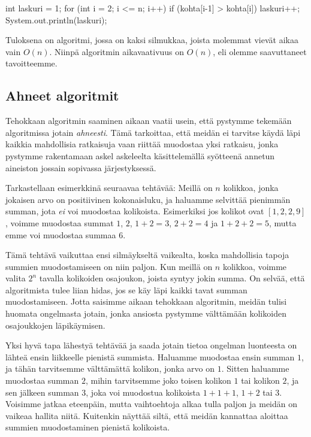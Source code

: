\begin{code}
int laskuri = 1;
for (int i = 2; i <= n; i++) {
    if (kohta[i-1] > kohta[i]) {
        laskuri++;
    }
}
System.out.println(laskuri);
\end{code}

Tuloksena on algoritmi, jossa on kaksi silmukkaa,
joista molemmat vievät aikaa vain $O(n)$.
Niinpä algoritmin aikavaativuus on $O(n)$,
eli olemme saavuttaneet tavoitteemme.

\subsection{Ahneet algoritmit}

Tehokkaan algoritmin saaminen aikaan vaatii usein,
että pystymme tekemään algoritmissa jotain \emph{ahneesti}.
Tämä tarkoittaa, että meidän ei tarvitse käydä läpi
kaikkia mahdollisia ratkaisuja vaan riittää muodostaa
yksi ratkaisu, jonka pystymme rakentamaan askel askeleelta
käsittelemällä syötteenä annetun aineiston jossain sopivassa järjestyksessä.

Tarkastellaan esimerkkinä seuraavaa tehtävää:
Meillä on $n$ kolikkoa, jonka jokaisen arvo on positiivinen kokonaisluku,
ja haluamme selvittää pienimmän summan, jota \emph{ei} voi muodostaa kolikoista.
Esimerkiksi jos kolikot ovat $[1,2,2,9]$, voimme muodostaa summat
$1$, $2$, $1+2=3$, $2+2=4$ ja $1+2+2=5$,
mutta emme voi muodostaa summaa $6$.

Tämä tehtävä vaikuttaa ensi silmäykseltä vaikealta,
koska mahdollisia tapoja summien muodostamiseen on niin paljon.
Kun meillä on $n$ kolikkoa, voimme valita $2^n$ tavalla
kolikoiden osajoukon, joista syntyy jokin summa.
On selvää, että algoritmista tulee liian hidas,
jos se käy läpi kaikki tavat summan muodostamiseen.
Jotta saisimme aikaan tehokkaan algoritmin,
meidän tulisi huomata ongelmasta jotain,
jonka ansiosta pystymme välttämään kolikoiden osajoukkojen läpikäymisen.

Yksi hyvä tapa lähestyä tehtävää ja saada jotain tietoa ongelman luonteesta
on lähteä ensin liikkeelle pienistä summista.
Haluamme muodostaa ensin summan $1$, ja tähän tarvitsemme välttämättä
kolikon, jonka arvo on $1$.
Sitten haluamme muodostaa summan $2$, mihin tarvitsemme joko
toisen kolikon $1$ tai kolikon $2$, ja sen jälkeen summan $3$,
joka voi muodostua kolikoista $1+1+1$, $1+2$ tai $3$.
Voisimme jatkaa eteenpäin, mutta vaihtoehtoja alkaa tulla
paljon ja meidän on vaikeaa hallita niitä.
Kuitenkin näyttää siltä, että meidän kannattaa aloittaa
summien muodostaminen pienistä kolikoista.

